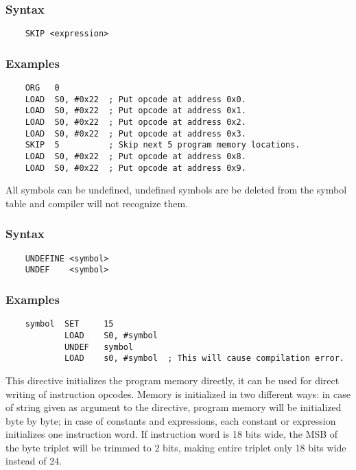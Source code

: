     \subsubsection{Syntax}
        \verb'    SKIP <expression>'

    \subsubsection{Examples}
        \verb'    ORG   0'\\
        \verb'    LOAD  S0, #0x22  ; Put opcode at address 0x0.'\\
        \verb'    LOAD  S0, #0x22  ; Put opcode at address 0x1.'\\
        \verb'    LOAD  S0, #0x22  ; Put opcode at address 0x2.'\\
        \verb'    LOAD  S0, #0x22  ; Put opcode at address 0x3.'\\
        \verb'    SKIP  5          ; Skip next 5 program memory locations.'\\
        \verb'    LOAD  S0, #0x22  ; Put opcode at address 0x8.'\\
        \verb'    LOAD  S0, #0x22  ; Put opcode at address 0x9.'

    All symbols can be undefined, undefined symbols are be deleted from the symbol table and compiler will not recognize them.

    \subsubsection{Syntax}
        \verb'    UNDEFINE <symbol>'\\
        \verb'    UNDEF    <symbol>'

    \subsubsection{Examples}
        \verb'    symbol  SET     15'\\
        \verb'            LOAD    S0, #symbol'\\
        \verb'            UNDEF   symbol'\\
        \verb'            LOAD    s0, #symbol  ; This will cause compilation error.'

    This directive initializes the program memory directly, it can be used for direct writing of instruction opcodes. Memory is initialized in two different ways: in case of string given as argument to the directive, program memory will be initialized byte by byte; in case of constants and expressions, each constant or expression initializes one instruction word. If instruction word is 18 bits wide, the MSB of the byte triplet will be trimmed to 2 bits, making entire triplet only 18 bits wide instead of 24.

